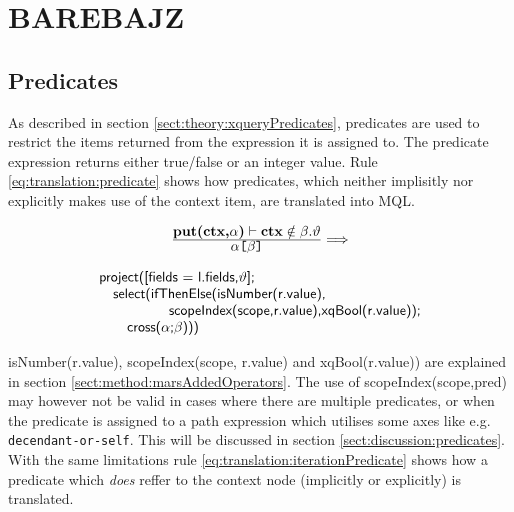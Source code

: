 \newpage
\section{BAREBAJZ}
\label{sect:translation:mXr}

\subsection{Predicates}
\label{sect:translation:mXr:predicates}
As described in section \ref{sect:theory:xqueryPredicates}, predicates are used to restrict the items returned
from the expression it is assigned to. The predicate expression returns either true/false or an integer value. Rule
\ref{eq:translation:predicate} shows how predicates, which neither implisitly nor explicitly makes use of the
context item, are translated into MQL. 

\begin{equation}
\centering
\begin{array}{c}
	\frac{\displaystyle \textbf{put(ctx,}\alpha\textbf{)}\vdash\textbf{ctx}\notin\beta.\vartheta}
	{\displaystyle \alpha\texttt{[}\beta\texttt{]}}

	\Longrightarrow 
	\\
	\mbox{}
	\\
	\begin{array}{l}
		\mbox{\textsf{project([fields = l.fields,}} \vartheta \mbox{\textsf{];}} 
		\\ \quad \mbox{\textsf{select(ifThenElse(isNumber(r.value),}} \\ \quad 
		\qquad\qquad \mbox{\textsf{scopeIndex(scope,r.value),xqBool(r.value));}} \\ \quad\quad
		\mbox{\textsf{cross(}} 
		\alpha \textsf{;}
		\beta \mbox{\textsf{)))}}
	\end{array}
\end{array}
\label{eq:translation:predicate}
\end{equation}


\textsf{isNumber(r.value), scopeIndex(scope, r.value)} and \textsf{xqBool(r.value))} are explained in section
\ref{sect:method:marsAddedOperators}. The use of \textsf{scopeIndex(scope,pred)} may however not be valid in cases
where there are multiple predicates, or when the predicate is assigned to a path expression which utilises some
axes like e.g. \texttt{decendant-or-self}. This will be discussed in section \ref{sect:discussion:predicates}.
With the same limitations rule \ref{eq:translation:iterationPredicate} shows how a predicate which \emph{does}
reffer to the context node (implicitly or explicitly) is translated.

